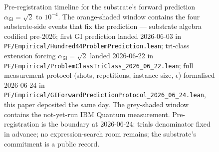 \documentclass[11pt,a4paper]{amsart}
\theoremstyle{plain}
\theoremstyle{definition}
\begin{document}
\begin{figure}[h]
\caption{Pre-registration timeline for the substrate's forward prediction $\alpha_{\textsf{GI}} = \sqrt{2}$ to $10^{-4}$. The orange-shaded window contains the four substrate-side events that fix the prediction --- substrate algebra codified pre-2026; first GI prediction landed 2026-06-03 in \texttt{PF/Empirical/Hundred44ProblemPrediction.lean}; tri-class extension forcing $\alpha_{\textsf{GI}} = \sqrt{2}$ landed 2026-06-22 in \texttt{PF/Empirical/ProblemClassTriClass\_2026\_06\_22.lean}; full measurement protocol (shots, repetitions, instance size, $\epsilon$) formalised 2026-06-24 in \texttt{PF/Empirical/GIForwardPredictionProtocol\_2026\_06\_24.lean}, this paper deposited the same day. The grey-shaded window contains the not-yet-run IBM Quantum measurement. Pre-registration is the boundary at 2026-06-24: trials denominator fixed in advance; no expression-search room remains; the substrate's commitment is a public record.}
\label{fig:timeline}
\end{figure}
\end{document}
